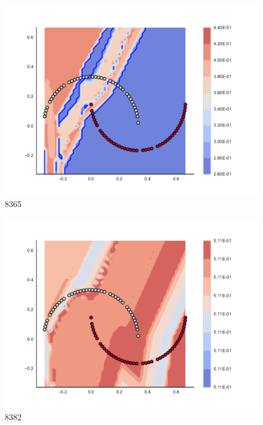 \begin{subfigure}[b]{0.09\textwidth}
    \includegraphics[clip, trim=2.35cm 1.75cm 4.5cm 0cm,width=\textwidth]{img/convergence/8365.pdf}
    \caption{8365}
    \label{fig:convergence_8365}
\end{subfigure}
%
\begin{subfigure}[b]{0.09\textwidth}
    \includegraphics[clip, trim=2.35cm 1.75cm 4.5cm 0cm,width=\textwidth]{img/convergence/8382.pdf}
    \caption{8382}
    \label{fig:convergence_8382}
\end{subfigure}
%
